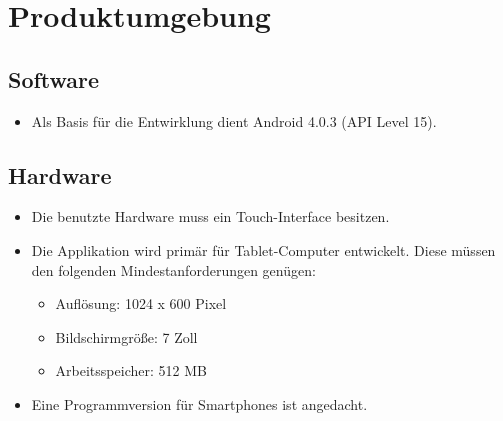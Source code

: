 \section{Produktumgebung}

\subsection{Software}
\begin{itemize}
	\item Als Basis für die Entwirklung dient Android 4.0.3 (API Level 15).
\end{itemize}
\subsection{Hardware}
\begin{itemize}
	\item Die benutzte Hardware muss ein Touch-Interface besitzen.
	\item Die Applikation wird primär für Tablet-Computer entwickelt. Diese müssen den folgenden Mindestanforderungen genügen:
	\begin{itemize}
		\item Auflösung: 1024 x 600 Pixel
		\item Bildschirmgröße: 7 Zoll
		\item Arbeitsspeicher: 512 MB
	\end{itemize}
	\item Eine Programmversion für Smartphones ist angedacht.
\end{itemize}
